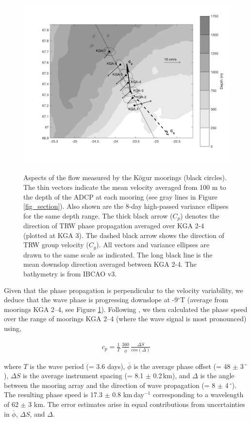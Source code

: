 \documentclass[12pt,titlepage,figuresatend]{article}
\begin{document}
\begin{figure}[ht!]
  \centering\includegraphics[width=\hsize]{./figures/map_ellipse.pdf}
  \caption{Aspects of the flow measured by the K\"{o}gur moorings (black circles). The thin vectors indicate the mean velocity averaged from 100 m to the depth of the ADCP at each mooring (see gray lines in Figure \ref{fig_section}). Also shown are the 8-day high-passed variance ellipses for the same depth range. The thick black arrow ($C_{p}$) denotes the direction of TRW phase propagation averaged over KGA 2-4 (plotted at KGA 3). The dashed black arrow shows the direction of TRW group velocity ($C_{g}$). All vectors and variance ellipses are drawn to the same scale as indicated. The long black line is the mean downslop direction averaged between KGA 2-4. The bathymetry is from IBCAO v3.}{\label{fig_ellipse}}
\end{figure}

Given that the phase propagation is perpendicular to the velocity variability, we deduce that the wave phase is progressing downslope at -9$^{\circ}$T (average from moorings KGA 2--4, see Figure \ref{fig_ellipse}). Following \cite{Pickart1990}, we then calculated the phase speed over the range of moorings KGA 2--4 (where the wave signal is most pronounced) using,

\begin{eqnarray*}
  c_p = \frac{1}{T}\, \frac{360}{\overline{\phi}}\, \frac{\overline{\Delta S}}{cos(\Delta)}
\end{eqnarray*}

where $T$ is the wave period (= 3.6 days), $\overline{\phi}$ is the average phase offset (= 48 $\pm$ 3$\,^{\circ}$), $\Delta S$ is the average instrument spacing (= 8.1 $\pm$ 0.2$\,$km), and $\Delta$ is the angle between the mooring array and the direction of wave propagation (= 8 $\pm$ 4$\,^{\circ}$). The resulting phase speed is 17.3 $\pm$ 0.8 km$\,$day$^{-1}$ corresponding to a wavelength of 62 $\pm$ 3 km. The error estimates arise in equal contributions from uncertainties in $\overline{\phi}$, $\Delta S$, and $\Delta$.
\end{document}

